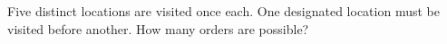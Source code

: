 Five distinct locations are visited once each. One designated location must be visited before another. How many orders are possible?

